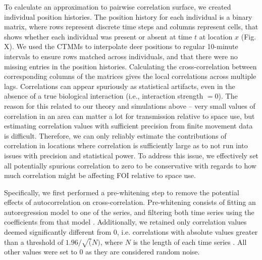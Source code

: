 \documentclass[letterpaper]{article}
\begin{document}
To calculate an approximation to pairwise correlation surface, we created individual position histories. The position history for each individual is a binary matrix, where rows represent discrete time steps and columns represent cells, that shows whether each individual was present or absent at time $t$ at location $x$ (Fig. X). We used the CTMMs to interpolate deer positions to regular 10-minute intervals \citep{Yang2023} to ensure rows matched across individuals, and that there were no missing entries in the position histories. Calculating the cross-correlation between corresponding columns of the matrices gives the local correlations across multiple lags. %
Correlations can appear spuriously as statistical artifacts, even in the absence of a true biological interaction (i.e., interaction strength $=0$).  The reason for this related to our theory and simulations above -- very small values of correlation in an area can matter a lot for transmission relative to space use, but estimating correlation values with sufficient precision from finite movement data is difficult.  Therefore, we can only reliably estimate the contributions of correlation in locations where correlation is sufficiently large as to not run into issues with precision and statistical power. To address this issue, we effectively set all potentially spurious correlation to zero to be conservative with regards to how much correlation might be affecting FOI relative to space use. 

Specifically, we first performed a pre-whitening step to remove the potential effects of autocorrelation on cross-correlation. Pre-whitening consists of fitting an autoregression model to one of the series, and filtering both time series using the coefficients from that model \citep{Dean2016}. Additionally, we retained only correlation values deemed significantly different from 0, i.e. correlations with absolute values greater than a threshold of $1.96/\sqrt(N)$, where $N$ is the length of each time series \citep{Dean2016}. All other values were set to 0 as they are considered random noise. 
\end{document}
